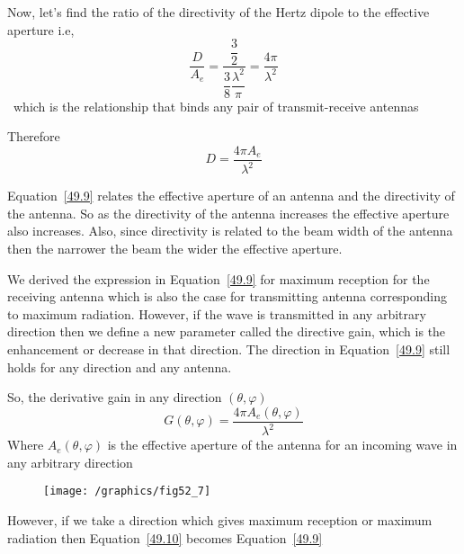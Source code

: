 Now, let's find the ratio  of the directivity of the Hertz dipole to the effective aperture i.e,
$$\dfrac{D}{A_{e}}=\dfrac{\dfrac{3}{2}}{\dfrac{3}{8}\dfrac{\lambda^{2}}{\pi}}= \dfrac{4\pi}{\lambda^{2}}$$ \ which is the relationship that binds any pair of transmit-receive antennas

Therefore
\begin{equation}
\label{49.9}
D=\dfrac{4\pi A_{e}}{\lambda^{2}}
\end{equation}

Equation~\ref{49.9} relates the effective aperture of an antenna and the directivity of the antenna. So as the directivity of the antenna increases the effective aperture also increases. Also, since directivity is related to the beam width of the antenna then the narrower the beam the wider the effective aperture.

We derived the expression in Equation~\ref{49.9} for maximum reception for the receiving antenna which is also the case for transmitting antenna corresponding to maximum radiation. However, if the wave is transmitted in any arbitrary direction then we define a new parameter called the directive gain, which is the enhancement or decrease in that direction. The direction in Equation~\ref{49.9} still holds for any direction and any antenna.

So, the derivative gain in any direction $(\theta, \varphi)$ 
\begin{equation}
\label{49.10}
G(\theta, \varphi)=\dfrac{4 \pi A_{e}(\theta, \varphi)}{\lambda^{2}}
\end{equation}
Where $A_{e}(\theta, \varphi)$ is the effective aperture of the antenna for an incoming wave in any arbitrary direction
\begin{figure}[h]
\centering
\texttt{[image: /graphics/fig52\_7]}
\caption{}
\label{fig 1}	
\end{figure}

However, if we take a direction which gives maximum reception or maximum radiation then Equation~\ref{49.10} becomes Equation~\ref{49.9}

